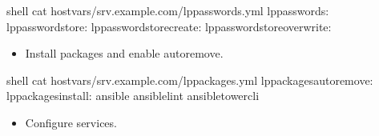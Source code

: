 \documentclass[letterpaper,10pt,english]{sphinxmanual}
\begin{document}
%
\begin{sphinxVerbatim}[commandchars=\\\{\},numbers=left,firstnumber=1,stepnumber=1]
shell\PYGZgt{} cat host\PYGZus{}vars/srv.example.com/lp\PYGZhy{}passwords.yml
lp\PYGZus{}passwords: 
lp\PYGZus{}passwordstore: 
lp\PYGZus{}passwordstore\PYGZus{}create: 
lp\PYGZus{}passwordstore\PYGZus{}overwrite: 
\end{sphinxVerbatim}
\sphinxresetverbatimhllines
\begin{itemize}
\item {} 
Install packages and enable autoremove.

\end{itemize}

%
\begin{sphinxVerbatim}[commandchars=\\\{\},numbers=left,firstnumber=1,stepnumber=1]
shell\PYGZgt{} cat host\PYGZus{}vars/srv.example.com/lp\PYGZhy{}packages.yml
lp\PYGZus{}packages\PYGZus{}autoremove: 
lp\PYGZus{}packages\PYGZus{}install:
  \PYGZhy{} ansible
  \PYGZhy{} ansible\PYGZhy{}lint
  \PYGZhy{} ansible\PYGZhy{}tower\PYGZhy{}cli
\end{sphinxVerbatim}
\sphinxresetverbatimhllines
\begin{itemize}
\item {} 
Configure services.

\end{itemize}
\end{document}

